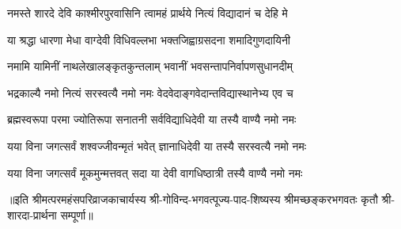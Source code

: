 

\twolineshloka
{नमस्ते शारदे देवि काश्मीरपुरवासिनि}
{त्वामहं प्रार्थये नित्यं विद्यादानं च देहि मे}

\twolineshloka
{या श्रद्धा धारणा मेधा वाग्देवी विधिवल्लभा}
{भक्तजिह्वाग्रसदना शमादिगुणदायिनी}

\twolineshloka
{नमामि यामिनीं नाथलेखालङ्कृतकुन्तलाम्}
{भवानीं भवसन्तापनिर्वापणसुधानदीम्}

\twolineshloka
{भद्रकाल्यै नमो नित्यं सरस्वत्यै नमो नमः}
{वेदवेदाङ्गवेदान्तविद्यास्थानेभ्य एव च}

\twolineshloka
{ब्रह्मस्वरूपा परमा ज्योतिरूपा सनातनी}
{सर्वविद्याधिदेवी या तस्यै वाण्यै नमो नमः}

\twolineshloka
{यया विना जगत्सर्वं शश्वज्जीवन्मृतं भवेत्}
{ज्ञानाधिदेवी या तस्यै सरस्वत्यै नमो नमः}

\twolineshloka
{यया विना जगत्सर्वं मूकमुन्मत्तवत् सदा}
{या देवी वागधिष्ठात्री तस्यै वाण्यै नमो नमः}

॥इति श्रीमत्परमहंसपरिव्राजकाचार्यस्य श्री-गोविन्द-भगवत्पूज्य-पाद-शिष्यस्य
श्रीमच्छङ्करभगवतः कृतौ श्री-शारदा-प्रार्थना सम्पूर्णा॥
